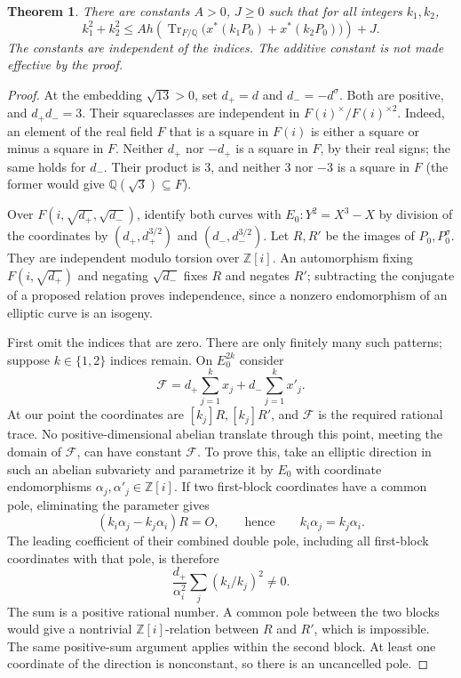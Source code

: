 \documentclass[11pt,a4paper]{article}
\newtheorem{theorem}{Theorem}[section]
\newcommand{\Q}{\mathbb Q}\newcommand{\Z}{\mathbb Z}
\DeclareMathOperator{\Tr}{Tr}\DeclareMathOperator{\Num}{Num}
\begin{document}
\begin{theorem}\label{thm:trace}
There are constants $A>0$, $J\ge0$ such that for all integers
$k_1,k_2$,
\[
 k_1^2+k_2^2\le A h\!\left(
 \Tr_{F/\Q}\bigl(x^*(k_1P_0)+x^*(k_2P_0)\bigr)
 \right)+J.
\]
The constants are independent of the indices. The additive constant
is not made effective by the proof.
\end{theorem}
\begin{proof}
At the embedding $\sqrt{13}>0$, set
$d_+=d$ and $d_-=-d^\sigma$. Both are positive, and $d_+d_-=3$.
Their squareclasses are independent in $F(i)^\times/F(i)^{\times2}$.
Indeed, an element of the real field $F$ that is a square in $F(i)$
is either a square or minus a square in $F$. Neither $d_+$ nor
$-d_+$ is a square in $F$, by their real signs; the same holds for
$d_-$. Their product is $3$, and neither $3$ nor $-3$ is a square in
$F$ (the former would give $\Q(\sqrt3)\subseteq F$).

Over $F(i,\sqrt{d_+},\sqrt{d_-})$, identify both curves with
$E_0:Y^2=X^3-X$ by division of the coordinates by
$(d_+,d_+^{3/2})$ and $(d_-,d_-^{3/2})$. Let $R,R'$ be the
images of $P_0,P_0^\sigma$. They are independent modulo torsion
over $\Z[i]$. An automorphism fixing $F(i,\sqrt{d_+})$ and
negating $\sqrt{d_-}$ fixes $R$ and negates $R'$; subtracting the
conjugate of a proposed relation proves independence, since a nonzero
endomorphism of an elliptic curve is an isogeny.

First omit the indices that are zero. There are only finitely many
such patterns; suppose $k\in\{1,2\}$ indices remain. On $E_0^{2k}$
consider
\[
 \mathcal F=d_+\sum_{j=1}^k x_j+d_-\sum_{j=1}^k x'_j.
\]
At our point the coordinates are $[k_j]R,[k_j]R'$, and
$\mathcal F$ is the required rational trace. No positive-dimensional
abelian translate through this point, meeting the domain of
$\mathcal F$, can have constant $\mathcal F$. To prove this, take an
elliptic direction in such an abelian subvariety and parametrize it
by $E_0$ with coordinate endomorphisms $\alpha_j,\alpha'_j\in\Z[i]$.
If two first-block coordinates have a common pole, eliminating the
parameter gives
\[
 (k_i\alpha_j-k_j\alpha_i)R=O,
 \qquad\text{hence}\qquad k_i\alpha_j=k_j\alpha_i.
\]
The leading coefficient of their combined double pole, including all
first-block coordinates with that pole, is therefore
\[
 \frac{d_+}{\alpha_i^2}\sum_j(k_i/k_j)^2\ne0.
\]
The sum is a positive rational number. A common pole between the two
blocks would give a nontrivial $\Z[i]$-relation between $R$ and $R'$,
which is impossible. The same positive-sum argument applies within
the second block. At least one coordinate of the direction is
nonconstant, so there is an uncancelled pole.


\end{proof}
\end{document}
